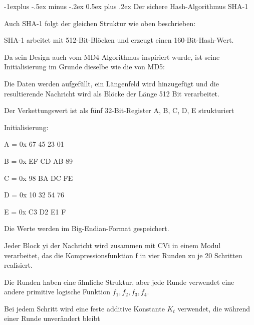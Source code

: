 \documentclass[a4paper]{article}
\makeatletter
\renewcommand{\subsection}{\@startsection{subsection}{2}{0mm}%
 {-1explus -.5ex minus -.2ex}%
 {0.5ex plus .2ex}%
 {\normalfont\normalsize\bfseries}}
\makeatother
\begin{document}
\begin{multicols}{3}
      \subsection{Der sichere Hash-Algorithmus
            SHA-1}

      \begin{itemize*}
            \item Auch SHA-1 folgt der gleichen Struktur wie oben beschrieben:
            \begin{itemize*}
                  \item SHA-1 arbeitet mit 512-Bit-Blöcken und erzeugt einen 160-Bit-Hash-Wert.
                  \item Da sein Design auch vom MD4-Algorithmus inspiriert wurde, ist seine Initialisierung im Grunde dieselbe wie die von MD5:
                  \begin{itemize*} \item Die Daten werden aufgefüllt, ein Längenfeld wird hinzugefügt und die resultierende Nachricht wird als Blöcke der Länge 512 Bit verarbeitet. \item Der Verkettungswert ist als fünf 32-Bit-Register A, B, C, D, E strukturiert \item Initialisierung:
                        \begin{itemize*} \item A = 0x 67 45 23 01 \item B = 0x EF CD AB 89 \item C = 0x 98 BA DC FE \item D = 0x 10 32 54 76 \item E = 0x C3 D2 E1 F \end{itemize*} \item Die Werte werden im Big-Endian-Format gespeichert. \end{itemize*}
                  \item Jeder Block yi der Nachricht wird zusammen mit CVi in einem Modul verarbeitet, das die Kompressionsfunktion f in vier Runden zu je 20 Schritten realisiert.
                  \begin{itemize*} \item Die Runden haben eine ähnliche Struktur, aber jede Runde verwendet eine andere primitive logische Funktion $f_1, f_2, f_3, f_4$. \item Bei jedem Schritt wird eine feste additive Konstante $K_t$ verwendet, die während einer Runde unverändert bleibt \end{itemize*}
            \end{itemize*}

\end{itemize*}
\end{multicols}
\end{document}
